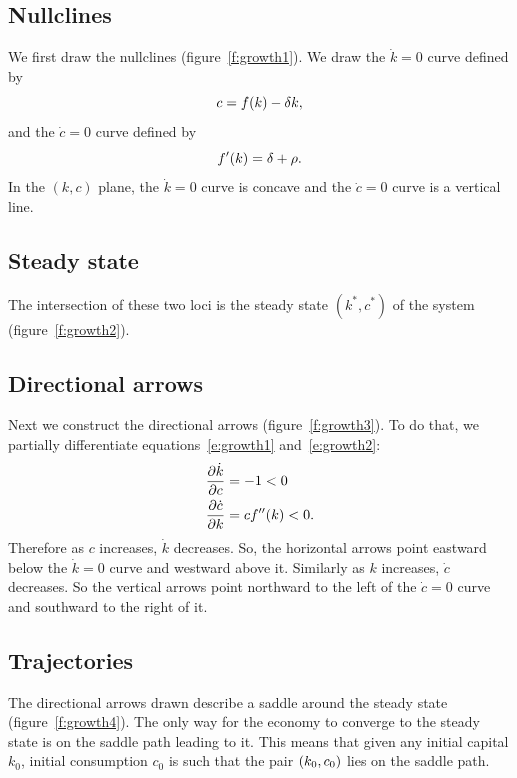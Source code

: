 \documentclass[letterpaper, 11pt, leqno]{article}
\begin{document}
\subsection{Nullclines}

We first draw the nullclines (figure~\ref{f:growth1}). We draw the $\dot{k}=0$ curve defined by
\begin{equation*}
c=f(k) -\delta k,
\end{equation*}
and the $\dot{c}=0$ curve defined by
\begin{equation*}
f'(k) =\delta +\rho.
\end{equation*}
In the $(k,c)$ plane, the $\dot{k}=0$ curve is concave and the $\dot{c}=0$ curve is a vertical line.

\subsection{Steady state}

The intersection of these two loci is the steady state $(k^{*},c^{*})$ of the system (figure~\ref{f:growth2}).

\subsection{Directional arrows}

Next we construct the directional arrows (figure~\ref{f:growth3}). To do that, we partially differentiate equations~\eqref{e:growth1} and~\eqref{e:growth2}: 
\begin{align*}
\pd{\dot{k}}{c} &=-1<0 \\
\pd{\dot{c}}{k} &=c f''(k)<0.
\end{align*}
Therefore as $c$ increases, $\dot{k}$ decreases. So, the horizontal arrows point eastward below the $\dot{k}=0$ curve and westward above it. Similarly as $k$ increases, $\dot{c}$ decreases. So the vertical arrows point northward to the left of the $\dot{c}=0$ curve and southward to the right of it.

\subsection{Trajectories}

The directional arrows drawn describe a saddle around the steady state (figure~\ref{f:growth4}). The only way for the economy to converge to the steady state is on the saddle path leading to it. This means that given any initial capital $k_{0}$, initial consumption $c_{0}$ is such that the pair $\left( k_{0},c_{0} \right) $ lies on the saddle path.
\end{document}
